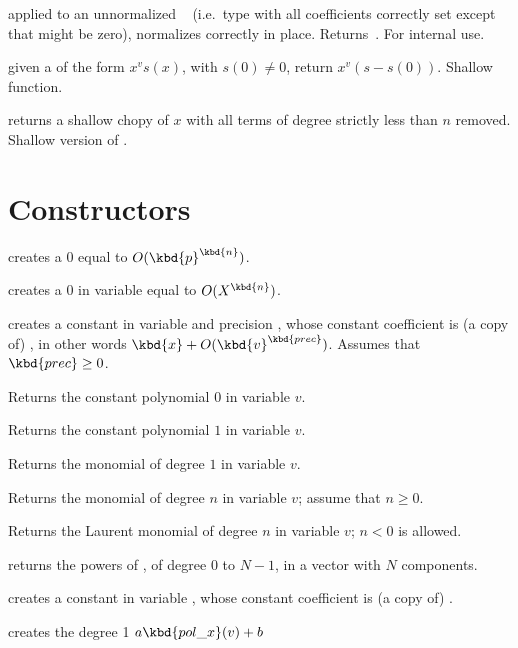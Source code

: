  applied to an unnormalized ~
(i.e.~type  with all coefficients correctly set except that 
might be zero), normalizes  correctly in place. Returns~.
For internal use.

 given a  of the form $x^v s(x)$, with
$s(0)\neq 0$, return $x^v(s - s(0))$. Shallow function.

 returns a shallow chopy of  $x$
with all terms of degree strictly less than $n$ removed. Shallow
version of .

\section{Constructors}

\label{se:clean}

 creates a $0$  equal to
$O(\kbd{p}^\kbd{n})$.

 creates a $0$  in variable
 equal to $O(X^\kbd{n})$.

 creates a constant 
in variable  and precision , whose constant coefficient is
(a copy of) , in other words $\kbd{x} + O(\kbd{v}^\kbd{prec})$.
Assumes that $\kbd{prec}\geq 0$.

 Returns the constant polynomial $0$ in variable $v$.

 Returns the constant polynomial $1$ in variable $v$.

 Returns the monomial of degree $1$ in variable $v$.

 Returns the monomial of degree $n$
in variable $v$; assume that $n \geq 0$.

 Returns the Laurent monomial of degree $n$
in variable $v$; $n < 0$ is allowed.

 returns the powers of
, of degree $0$ to $N-1$, in a vector with $N$ components.

 creates a constant  in variable
, whose constant coefficient is (a copy of) .

 creates the degree 1 
$a \kbd{pol\_x}(v) + b$

